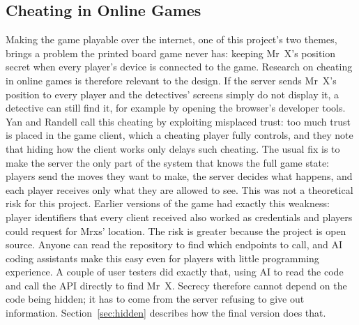 \documentclass[lettersize,journal]{IEEEtran}
\begin{document}
\subsection{Cheating in Online Games}
Making the game playable over the internet, one of this project's two themes, brings a problem the printed board game never has: keeping Mr~X's position secret when every player's device is connected to the game. Research on cheating in online games is therefore relevant to the design. If the server sends Mr~X's position to every player and the detectives' screens simply do not display it, a detective can still find it, for example by opening the browser's developer tools. Yan and Randell \cite{yan2005cheating} call this cheating by exploiting misplaced trust: too much trust is placed in the game client, which a cheating player fully controls, and they note that hiding how the client works only delays such cheating. The usual fix is to make the server the only part of the system that knows the full game state: players send the moves they want to make, the server decides what happens, and each player receives only what they are allowed to see. This was not a theoretical risk for this project. Earlier versions of the game had exactly this weakness: player identifiers that every client received also worked as credentials and players could request for Mrxs' location. The risk is greater because the project is open source. Anyone can read the repository to find which endpoints to call, and AI coding assistants make this easy even for players with little programming experience. A couple of user testers did exactly that, using AI to read the code and call the API directly to find Mr~X. Secrecy therefore cannot depend on the code being hidden; it has to come from the server refusing to give out information. Section~\ref{sec:hidden} describes how the final version does that.
\end{document}
